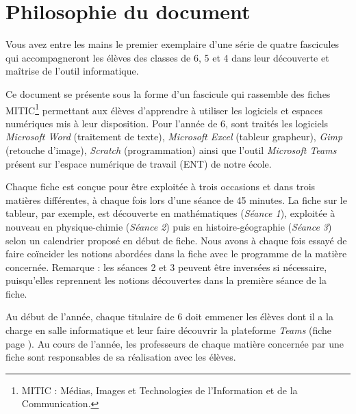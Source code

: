 \chapter*{Philosophie du document}



Vous avez entre les mains le premier exemplaire d'une série de quatre fascicules qui accompagneront les élèves des classes de 6, 5 et 4 dans leur découverte et maîtrise de l'outil informatique.

\vspace{18pt}

Ce document se présente sous la forme d'un fascicule qui rassemble des fiches MITIC\footnote{MITIC : Médias, Images et Technologies de l'Information et de la Communication.} permettant aux élèves d'apprendre à utiliser les logiciels et espaces numériques mis à leur disposition. Pour l'année de 6, sont traités les logiciels \emph{Microsoft Word} (traitement de texte), \emph{Microsoft Excel} (tableur grapheur), \emph{Gimp} (retouche d'image), \emph{Scratch} (programmation) ainsi que l'outil \emph{Microsoft Teams} présent sur l'espace numérique de travail (ENT) de notre école. %

\vspace{18pt}


Chaque fiche est conçue pour être exploitée à trois occasions et dans trois matières différentes, à chaque fois lors d'une séance de 45 minutes. La fiche sur le tableur, par exemple, est découverte en mathématiques (\emph{Séance 1}), exploitée à nouveau en physique-chimie (\emph{Séance 2}) puis en histoire-géographie (\emph{Séance 3}) selon un calendrier proposé en début de fiche. Nous avons à chaque fois essayé de faire coïncider les notions abordées dans la fiche avec le programme de la matière concernée. Remarque : les séances 2 et 3 peuvent être inversées si nécessaire, puisqu'elles reprennent les notions découvertes dans la première séance de la fiche.

\vspace{18pt}

Au début de l'année, chaque titulaire de 6 doit emmener les élèves dont il a la charge en salle informatique et leur faire découvrir la plateforme \emph{Teams} (fiche page \pageref{teams1}). Au cours de l'année, les professeurs de chaque matière concernée par une fiche sont responsables de sa réalisation avec les élèves.

